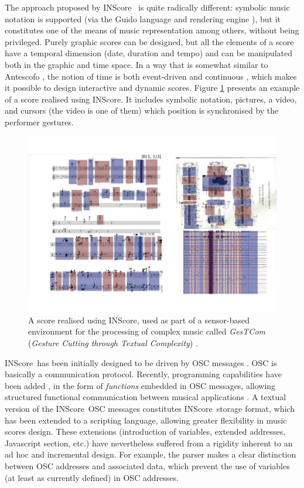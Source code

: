 \documentclass[runningheads]{llncs}
\newcommand{\IS}		{INScore}
\begin{document}
The approach proposed by \IS\ \cite{Fober:12a} is quite radically different: symbolic music notation is supported (via the Guido language and rendering engine \cite{Dau:09b,hoos98}), but it constitutes one of the means of music representation among others, without being privileged. 
Purely graphic scores can be designed, but all the elements of a score have a temporal dimension (date, duration and tempo) and can be manipulated both in the graphic and time space. In a way that is somewhat similar to Antescofo \cite{acont08}, the notion of time is both event-driven and continuous \cite{fober17c}, which makes it possible to design interactive and dynamic scores. Figure \ref{pavlos} presents an example of a score realised using \IS . It includes symbolic notation, pictures, a video, and cursors (the video is one of them) which position is synchronised by the performer gestures.

\begin{figure}
\begin{center}
\includegraphics[width=0.75\columnwidth]{imgs/inscore-score}
\caption{A score realised using \IS , used as part of a sensor-based environment for the processing of complex music called \emph{GesTCom} (\emph{Gesture Cutting through Textual Complexity}) \cite{antoniadis:tel-01861171}.}
\label{pavlos}
\end{center}
\end{figure}

\IS\ has been initially designed to be driven by OSC messages \cite{OSC}. OSC is basically a communication protocol. Recently, programming capabilities have been added \cite{429}, in the form of \emph{functions} embedded in OSC messages, allowing structured functional communication between musical applications \cite{bresson:hal-01353794}. 
A textual version of the \IS\ OSC messages constitutes \IS\ storage format, which has been extended to a scripting language, \cite{Fober:13b} allowing greater flexibility in music scores design.
These extensions (introduction of variables, extended addresses, Javascript section, etc.) have nevertheless suffered from a rigidity inherent to an ad hoc and incremental design. For example, the parser makes a clear distinction between OSC addresses and associated data, which prevent the use of variables (at least as currently defined) in OSC addresses.
\end{document}
